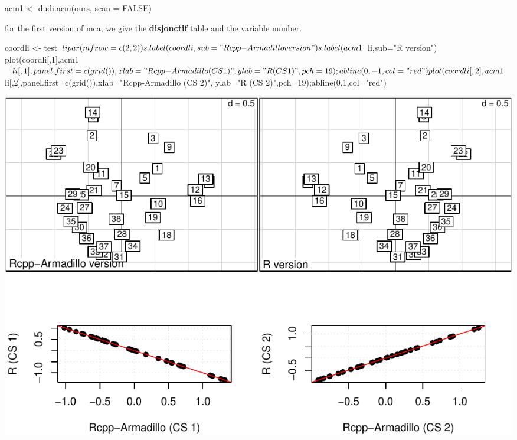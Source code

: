 \documentclass[
  10pt,
]{article}
\newenvironment{Shaded}{\begin{snugshade}}{\end{snugshade}}
\newcommand{\NormalTok}[1]{#1}
\begin{document}
\begin{Shaded}
\begin{Highlighting}[]
\NormalTok{acm1 \textless{}{-} dudi.acm(ours, scan = FALSE)}
\end{Highlighting}
\end{Shaded}

for the first version of mca, we give the \textbf{disjonctif} table and
the variable number.

\begin{Shaded}
\end{Shaded}

\begin{Shaded}
\begin{Highlighting}[]
\NormalTok{coordli \textless{}{-} test$li}
\NormalTok{par(mfrow=c(2,2))}
\NormalTok{s.label(coordli,sub="Rcpp{-}Armadillo version")}
\NormalTok{s.label(acm1$li,sub="R version")}
\NormalTok{plot(coordli[,1],acm1$li[,1],panel.first=c(grid()),xlab="Rcpp{-}Armadillo (CS 1)",}
\NormalTok{     ylab="R (CS 1)",pch=19);abline(0,{-}1,col="red")}
\NormalTok{plot(coordli[,2],acm1$li[,2],panel.first=c(grid()),xlab="Rcpp{-}Armadillo (CS 2)",}
\NormalTok{     ylab="R (CS 2)",pch=19);abline(0,1,col="red")}
\end{Highlighting}
\end{Shaded}

\includegraphics{RandPytonAnalysisPDF_files/figure-latex/unnamed-chunk-63-1.pdf}
\end{document}
